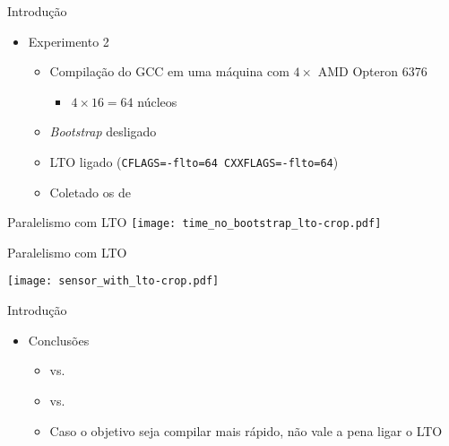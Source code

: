 \begin{frame}{Introdução}
    \begin{itemize}
        \item Experimento 2
        \begin{itemize}
            \item Compilação do GCC em uma máquina com $4\times$ AMD Opteron 6376
                \begin{itemize}
                    \item $4 \times 16 = 64$ núcleos
                \end{itemize}
            \item \textit{Bootstrap} desligado
            \item LTO ligado (\texttt{CFLAGS=-flto=64 CXXFLAGS=-flto=64})
            \item Coletado os {\color{blue}{tempos de compilação}} de {\color{red}{cada arquivo}}
        \end{itemize}
    \end{itemize}
\end{frame}

\begin{frame}
    Paralelismo com LTO
    \texttt{[image: time\_no\_bootstrap\_lto-crop.pdf]}
    \label{fig:analysis_lto}
\end{frame}

\begin{frame}
    Paralelismo com LTO

    \centering
    \texttt{[image: sensor\_with\_lto-crop.pdf]}
    \label{fig:analysis_lto}
\end{frame}

\begin{frame}{Introdução}
    \begin{itemize}
        \item Conclusões
        \begin{itemize}
            \item {\color{blue}{180s sem LTO}} vs. {\color{red}{300s com LTO}}
            \item {\color{blue}{1.8Wh sem LTO}} vs. {\color{red}{2.7Wh com LTO}}
            \item Caso o objetivo seja compilar mais rápido, não vale a pena ligar o LTO
        \end{itemize}
    \end{itemize}
\end{frame}

